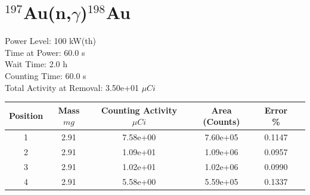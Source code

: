 \newpage

\section*{ $^{197}$Au(n,$\gamma$)$^{198}$Au }

Power Level: 100 kW(th) \\
Time at Power: 60.0 s \\
Wait Time:  2.0 h \\
Counting Time: 60.0 s \\
Total Activity at Removal: 3.50e+01 $\mu Ci$

\begin{table}[h]
\centering
\begin{tabular}{ |c|c|c|c|c|c| }
 \hline
 Position & Mass $mg$ & Counting Activity $\mu Ci$ & Area (Counts) & Error \% \\
 \hline 
 1 & 2.91 & 7.58e+00 & 7.60e+05 & 0.1147 \\ 
\hline
 2 & 2.91 & 1.09e+01 & 1.09e+06 & 0.0957 \\ 
\hline
 3 & 2.91 & 1.02e+01 & 1.02e+06 & 0.0990 \\ 
\hline
 4 & 2.91 & 5.58e+00 & 5.59e+05 & 0.1337 \\ 
\hline
\end{tabular}
\end{table}

